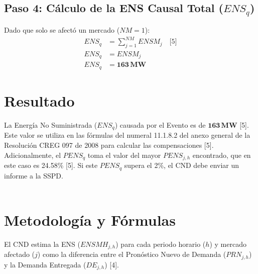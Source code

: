 \documentclass[a5paper]{book}%
\begin{document}
\subsection*{Paso 4: Cálculo de la ENS Causal Total ($ENS_q$)}

Dado que solo se afectó un mercado ($NM=1$):
\begin{align*}
	ENS_q &= \sum_{j=1}^{NM} ENSM_j \quad \text{[5]} \\
	ENS_q &= ENSM_j \\
	ENS_q &= \mathbf{163 \, \text{MW}}
\end{align*}

\section*{Resultado}

La Energía No Suministrada ($ENS_q$) causada por el Evento es de $\mathbf{163 \, \text{MW}}$ [5]. Este valor se utiliza en las fórmulas del numeral 11.1.8.2 del anexo general de la Resolución CREG 097 de 2008 para calcular las compensaciones [5]. Adicionalmente, el $PENS_q$ toma el valor del mayor $PENS_{j,h}$ encontrado, que en este caso es 24.58\% [5]. Si este $PENS_q$ supera el 2\%, el CND debe enviar un informe a la SSPD.\\\\




\section*{Metodología y Fórmulas}

El CND estima la ENS ($ENSMH_{j,h}$) para cada periodo horario ($h$) y mercado afectado ($j$) como la diferencia entre el Pronóstico Nuevo de Demanda ($PRN_{j,h}$) y la Demanda Entregada ($DE_{j,h}$) [4].
\end{document}

